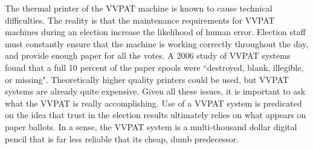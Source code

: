 \documentclass[12pt, titlepage]{article}
\begin{document}
The thermal printer of the VVPAT machine is known to cause technical difficulties. The reality is that the maintenance requirements for VVPAT machines during an election increase the likelihood of human error. Election staff must constantly ensure that the machine is working correctly throughout the day, and provide enough paper for all the votes. A 2006 study of VVPAT systems found that a full 10 percent of the paper spools were ``destroyed, blank, illegible, or missing". \cite{goggin2007examination} Theoretically higher quality printers could be used, but VVPAT systems are already quite expensive. Given all these issues, it is important to ask what the VVPAT is really accomplishing. Use of a VVPAT system is predicated on the idea that trust in the election results ultimately relies on what appears on paper ballots. In a sense, the VVPAT system is a multi-thousand dollar digital pencil that is far less reliable that its cheap, dumb predecessor.
\end{document}
